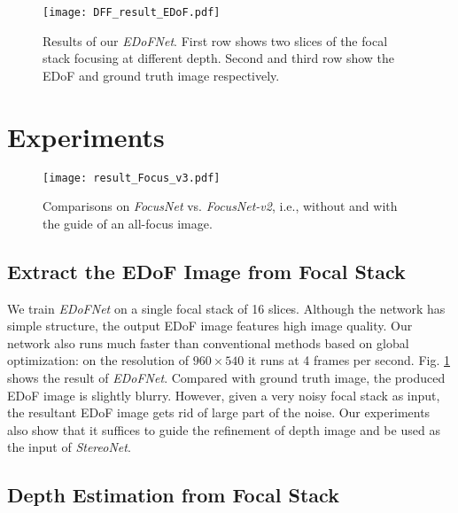 \documentclass[10pt,twocolumn,letterpaper]{article}
\begin{document}
\begin{figure}[t]
\begin{center}
   \texttt{[image: DFF\_result\_EDoF.pdf]}
\end{center}
\vspace{-8pt}
   \caption{Results of our \emph{EDoFNet}. First row shows two slices of the focal stack focusing at different depth. Second and third row show the EDoF and ground truth image respectively.}
\label{fig:result_EDoF}
\end{figure}
\section{Experiments}
\label{section:experiments}

\begin{figure*}[h]
\begin{center}
   \texttt{[image: result\_Focus\_v3.pdf]}
\end{center}
\vspace{-8pt}
   \caption{Comparisons on \emph{FocusNet} vs. \emph{FocusNet-v2}, i.e., without and with the guide of an all-focus image.}
\label{fig:result_DfF}
\end{figure*}

\subsection{Extract the EDoF Image from Focal Stack}
We train \emph{EDoFNet} on a single focal stack of 16 slices. Although the network has simple structure, the output EDoF image features high image quality. Our network also runs much faster than conventional methods based on global optimization: on the resolution of $960\times540$ it runs at 4 frames per second. Fig. \ref{fig:result_EDoF} shows the result of \emph{EDoFNet}. Compared with ground truth image, the produced EDoF image is slightly blurry. However, given a very noisy focal stack as input, the resultant EDoF image gets rid of large part of the noise. Our experiments also show that it suffices to guide the refinement of depth image and be used as the input of \emph{StereoNet}.



\subsection{Depth Estimation from Focal Stack}
\label{section:result_FocalStack}
\end{document}
